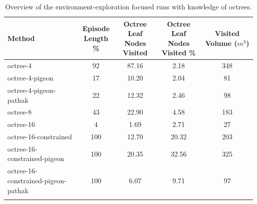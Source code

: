 \begin{longtable}{|l|c|c|c|c|}                            \hline
    \textbf{Method}            
    & \theadcentered{Episode \\ Length \%}          
    & \theadcentered{Octree Leaf \\ Nodes Visited} 
    & \theadcentered{Octree Leaf \\ Nodes Visited \%} 
    & \theadcentered{Visited  \\ Volume  ($m^3$)} 
    \\ \hline
  
    
    octree-4 & 92 & 87.16 & 2.18 & {\cellcolor[HTML]{55AA99}} \color[HTML]{000000} 348 \\ \hline
    octree-4-pigeon & 17 & 10.20 & 2.04 & {\cellcolor[HTML]{EBF2F0}} \color[HTML]{000000} 81 \\ \hline
    octree-4-pigeon-pathak & 22 & 12.32 & 2.46 & {\cellcolor[HTML]{EBF2F0}} \color[HTML]{000000} 98 \\ \hline
    octree-8 & 43 & 22.90 & 4.58 & {\cellcolor[HTML]{EBF2F0}} \color[HTML]{000000} 183 \\ \hline
    octree-16 & 4 & 1.69 & 2.71 & {\cellcolor[HTML]{EBF2F0}} \color[HTML]{000000} 27 \\ \hline
    octree-16-constrained & 100 & 12.70 & 20.32 & {\cellcolor[HTML]{DDEBE8}} \color[HTML]{000000} 203 \\ \hline
    octree-16-constrained-pigeon & 100 & 20.35 & 32.56 & {\cellcolor[HTML]{6AB4A5}} \color[HTML]{000000} 325 \\ \hline
    octree-16-constrained-pigeon-pathak & 100 & 6.07 & 9.71 & {\cellcolor[HTML]{EBF2F0}} \color[HTML]{000000} 97 \\ \hline
    
    \caption{Overview of the environment-exploration focused runs with knowledge of octrees. 
    }
    \label{tab:RQ2-results}
\end{longtable}


